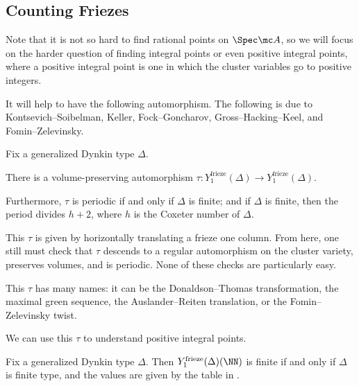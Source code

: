 \documentclass[../notes.tex]{subfiles}
\begin{document}
\subsection{Counting Friezes}
Note that it is not so hard to find rational points on $\Spec\mc A$, so we will focus on the harder question of finding integral points or even positive integral points, where a positive integral point is one in which the cluster variables go to positive integers.

It will help to have the following automorphism. The following is due to Kontsevich--Soibelman, Keller, Fock--Goncharov, Gross--Hacking--Keel, and Fomin--Zelevinsky.
\begin{theorem} \label{thm:tau-exists}
	Fix a generalized Dynkin type $\Delta$.
	\begin{listalph}
		\item There is a volume-preserving automorphism $\tau\colon Y_1^{\mathrm{frieze}}(\Delta)\to Y_1^{\mathrm{frieze}}(\Delta)$.
		\item Furthermore, $\tau$ is periodic if and only if $\Delta$ is finite; and if $\Delta$ is finite, then the period divides $h+2$, where $h$ is the Coxeter number of $\Delta$.
	\end{listalph}
\end{theorem}
\begin{remark}
	This $\tau$ is given by horizontally translating a frieze one column. From here, one still must check that $\tau$ descends to a regular automorphism on the cluster variety, preserves volumes, and is periodic. None of these checks are particularly easy. %
\end{remark}
\begin{remark}
	This $\tau$ has many names: it can be the Donaldson--Thomas transformation, the maximal green sequence, the Auslander--Reiten translation, or the Fomin--Zelevinsky twist.
\end{remark}
We can use this $\tau$ to understand positive integral points.
\begin{theorem}[Zhang]
	Fix a generalized Dynkin type $\Delta$. Then $Y_1^{\mathrm{frieze}}(\Delta)(\NN)$ is finite if and only if $\Delta$ is finite type, and the values are given by the table in .
\end{theorem}
\end{document}

